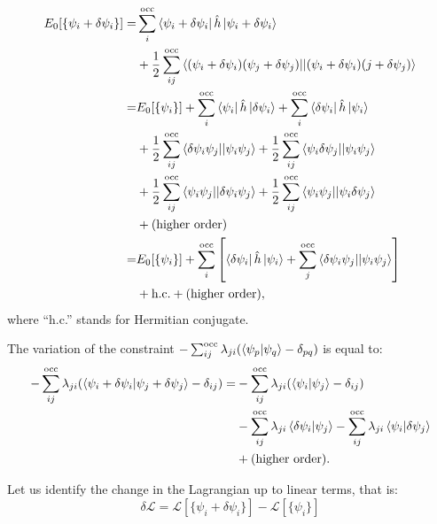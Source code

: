 \documentclass[../Main/chem532-notes.tex]{subfiles}
\begin{document}
\begin{equation}
\begin{split}
E_0[\{ \psi_i +  \delta \psi_i\}] =&
\sum_i^{\rm occ} \bra{\psi_i + \delta \psi_i} \hat{h} \ket{\psi_i + \delta \psi_i} \\
&+ \frac{1}{2} \sum_{ij}^{\rm occ} \bra{(\psi_i + \delta \psi_i) (\psi_j + \delta \psi_j)}\!\ket{(\psi_i + \delta \psi_i) (j + \delta \psi_j)} \\
=& E_0[\{ \psi_i \}] + \sum_i^{\rm occ} \bra{\psi_i} \hat{h} \ket{\delta \psi_i}
+ \sum_i^{\rm occ} \bra{\delta \psi_i} \hat{h} \ket{\psi_i} \\
&+ \frac{1}{2} \sum_{ij}^{\rm occ} \bra{\delta \psi_i \psi_j}\!\ket{\psi_i \psi_j}
+ \frac{1}{2} \sum_{ij}^{\rm occ} \bra{\psi_i \delta \psi_j}\!\ket{\psi_i \psi_j} \\
&+ \frac{1}{2} \sum_{ij}^{\rm occ} \bra{\psi_i \psi_j}\!\ket{\delta \psi_i \psi_j}
+ \frac{1}{2} \sum_{ij}^{\rm occ} \bra{\psi_i \psi_j}\!\ket{\psi_i \delta \psi_j}\\
&+ \text{(higher order)} \\
=& E_0[\{ \psi_i \}] + \sum_i^{\rm occ} \left[ \bra{\delta \psi_i} \hat{h} \ket{\psi_i} 
+ \sum_{j}^{\rm occ} \bra{\delta \psi_i \psi_j}\!\ket{\psi_i \psi_j} \right]\\&+ \text{h.c.} + \text{(higher order)},
\end{split}
\end{equation}
where ``h.c.'' stands for Hermitian conjugate.

The variation of the constraint $- \sum_{ij}^\mathrm{occ} \lambda_{ji} (\braket{\psi_p|\psi_q} - \delta_{pq})$ is equal to:
\begin{equation}
\begin{split}
- \sum_{ij}^\mathrm{occ} \lambda_{ji} (\braket{\psi_i + \delta \psi_i|\psi_j + \delta \psi_j} - \delta_{ij})
=& - \sum_{ij}^\mathrm{occ} \lambda_{ji} (\braket{\psi_i|\psi_j} - \delta_{ij}) \\
& - \sum_{ij}^\mathrm{occ} \lambda_{ji} \braket{\delta\psi_i|\psi_j}  - \sum_{ij}^\mathrm{occ} \lambda_{ji} \braket{\psi_i|\delta\psi_j} \\
&+ \text{(higher order)}.
\end{split}
\end{equation}

Let us identify the change in the Lagrangian up to linear terms, that is:
\begin{equation}
\delta \mathcal{L} = \mathcal{L}[\{ \psi_i  + \delta \psi_i \}] - \mathcal{L}[\{ \psi_i  \}]
\end{equation}
\end{document}
